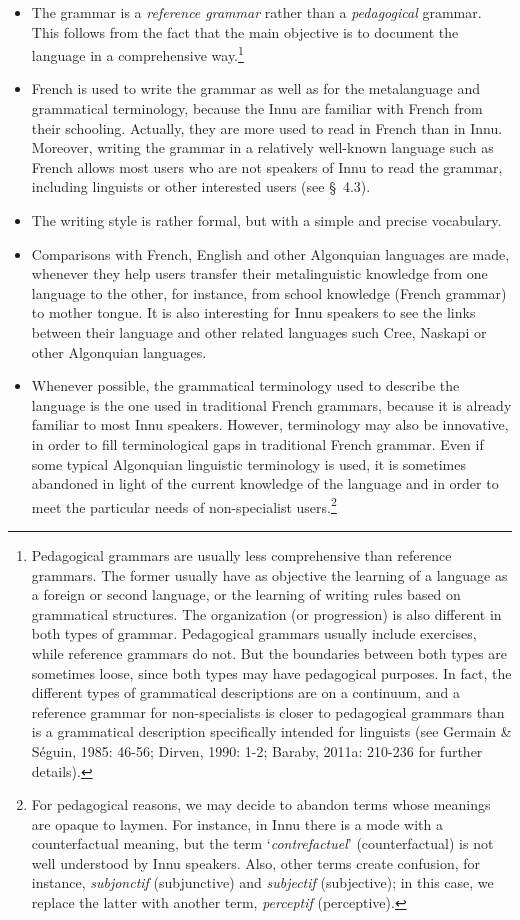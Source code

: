 \documentclass[letterpaper]{article}
\begin{document}
\begin{itemize}
\item The grammar is a \textit{reference grammar} rather than a \textit{pedagogical} grammar. This follows from the fact that the main objective is to document the language in a comprehensive way.\footnote{ Pedagogical grammars are usually less comprehensive than reference grammars. The former usually have as objective the learning of a language as a foreign or second language, or the learning of writing rules based on grammatical structures. The organization (or progression) is also different in both types of grammar. Pedagogical grammars usually include exercises, while reference grammars do not. But the boundaries between both types are sometimes loose, since both types may have pedagogical purposes. In fact, the different types of grammatical descriptions are on a continuum, and a reference grammar for non-specialists is closer to pedagogical grammars than is a grammatical description specifically intended for linguists (see Germain \& S\'eguin, 1985: 46-56; Dirven, 1990: 1-2; Baraby, 2011a: 210-236 for further details).}
\item French is used to write the grammar as well as for the metalanguage and grammatical terminology, because the Innu are familiar with French from their schooling. Actually, they are more used to read in French than in Innu. Moreover, writing the grammar in a relatively well-known language such as French allows most users who are not speakers of Innu to read the grammar, including linguists or other interested users (see {\S}~4.3). 
\item The writing style is rather formal, but with a simple and precise vocabulary.
\item Comparisons with French, English and other Algonquian languages are made, whenever they help users transfer their metalinguistic knowledge from one language to the other, for instance, from school knowledge (French grammar) to mother tongue. It is also interesting for Innu speakers to see the links between their language and other related languages such Cree, Naskapi or other Algonquian languages.
\item Whenever possible, the grammatical terminology used to describe the language is the one used in traditional French grammars, because it is already familiar to most Innu speakers. However, terminology may also be innovative, in order to fill terminological gaps in traditional French grammar. Even if some typical Algonquian linguistic terminology is used, it is sometimes abandoned in light of the current knowledge of the language and in order to meet the particular needs of non-specialist users.\footnote{ For pedagogical reasons, we may decide to abandon terms whose meanings are opaque to laymen. For instance, in Innu there is a mode with a counterfactual meaning, but the term {\textquoteleft}\textit{contrefa}\textit{c}\textit{t}\textit{u}\textit{e}\textit{l}{\textquoteright} (counterfactual) is not well understood by Innu speakers. Also, other terms create confusion, for instance, \textit{subjonctif} (subjunctive) and \textit{subjectif} (subjective); in this case, we replace the latter with another term, \textit{percepti}\textit{f }(perceptive).}

\end{itemize}
\end{document}
